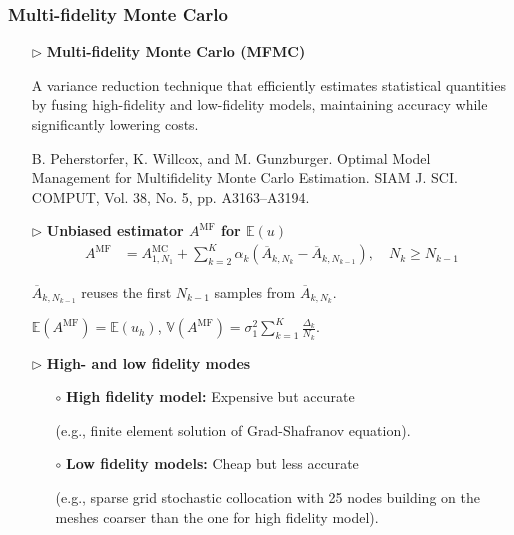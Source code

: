 \documentclass{beamer}
\begin{document}
\begin{frame}[t]
    \frametitle{Multi-fidelity Monte Carlo}
\begin{itemize}[leftmargin=5pt] 
\item[$\triangleright$] \textcolor{myblue3}{\bf Multi-fidelity Monte Carlo (MFMC)} 

{\footnotesize A variance reduction technique that efficiently estimates statistical quantities by fusing high-fidelity and low-fidelity models, maintaining accuracy while significantly lowering costs.}

%
\vspace{2mm}
%
{\fontsize{7}{7}\selectfont \textcolor{mygray2}{B. Peherstorfer, K. Willcox, and M. Gunzburger. Optimal Model Management for Multifidelity Monte Carlo Estimation. SIAM J. SCI. COMPUT, Vol. 38, No. 5, pp. A3163–A3194.}\par}
%

\item[$\triangleright$]\textcolor{myblue3}{\bf Unbiased estimator $A^{\text{MF}}$ for $\mathbb{E}(u)$} 
{\fontsize{7}{7}\selectfont 
\begin{align*}
A^{\text{MF}} &= A^{\text{MC}}_{1,N_1} + \sum_{k=2}^K \alpha_k\left(\overline{A}_{k,N_k} - \overline{A}_{k,N_{k-1}} \right), \quad N_k\ge N_{k-1}
\end{align*}
}
\vspace{-5mm}

{\footnotesize 
$\overline{A}_{k,N_{k-1}}$ reuses the first $N_{k-1}$ samples from $\overline{A}_{k,N_{k}}$.

$\mathbb{E}(A^{\text{MF}}) = \mathbb{E}(u_h)$, $\mathbb{V}(A^{\text{MF}})= \sigma_1^2\sum_{k=1}^K\frac{\Delta_{k}}{N_k}$.
}



\item[$\triangleright$] \textcolor{myblue3}{\bf High- and low fidelity modes} 

{\footnotesize 
\begin{itemize}[leftmargin=5pt] 
     \item[$\circ$] {\bf High fidelity model:} Expensive but accurate 
     
     (e.g., finite element solution of Grad-Shafranov equation).
     \item[$\circ$] {\bf Low fidelity models:} Cheap but less accurate 
     
     (e.g., sparse grid stochastic collocation with 25 nodes building on the meshes coarser than the one for high fidelity model).
\end{itemize}
 }

\end{itemize}
\end{frame}
\end{document}
